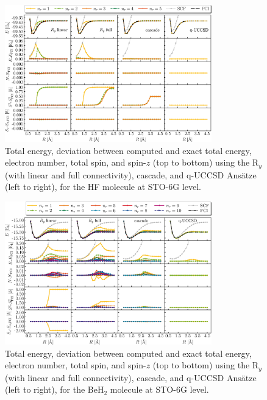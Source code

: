 \documentclass[aps,pra,onecolumn]{revtex4-2}
\begin{document}
\begin{figure}[t!]
\includegraphics[width=0.8\textwidth]{../figures/second_quantization_hf/second_quantization_hf.eps}
\caption{Total energy, deviation between computed and exact total energy, electron number, total spin, and spin-$z$ (top to bottom) 
using the R$_y$ (with linear and full connectivity), cascade, and q-UCCSD Ans\"{a}tze (left to right), for the HF molecule at STO-6G level.}
\label{figure:second_hf}
\end{figure}

\begin{figure}[t!]
\includegraphics[width=0.8\textwidth]{../figures/second_quantization_beh2/second_quantization_beh2.eps}
\caption{Total energy, deviation between computed and exact total energy, electron number, total spin, and spin-$z$ (top to bottom) 
using the R$_y$ (with linear and full connectivity), cascade, and q-UCCSD Ans\"{a}tze (left to right), for the BeH$_2$ molecule at STO-6G level.
}
\label{figure:second_beh2}
\end{figure}
\end{document}
